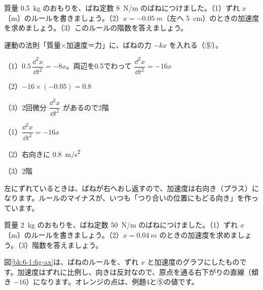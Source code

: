 \begin{reidai}[ばねのルール]
質量 \qty{0.5}{kg} のおもりを、ばね定数 \qty{8}{N/m} のばねにつけました。（1）ずれ $x$〔m〕のルールを書きましょう。（2）$x=\qty{-0.05}{m}$（左へ \qty{5}{cm}）のときの加速度を求めましょう。（3）このルールの階数を答えましょう。\par
\kangaekata 運動の法則「質量×加速度＝力」に、ばねの力 $-kx$ を入れる（⑤）。\par
\shiki （1）$0.5\,\dfrac{\dd^2x}{\dd t^2}=-8x$。両辺を0.5でわって $\dfrac{\dd^2x}{\dd t^2}=-16x$\par
\hspace*{2.6\zw}（2）$-16\times(-0.05)=0.8$\par
\hspace*{2.6\zw}（3）2回微分 $\dfrac{\dd^2x}{\dd t^2}$ があるので2階\par
\kotae （1）$\dfrac{\dd^2x}{\dd t^2}=-16x$\par
\hspace*{3.2\zw}（2）右向きに \qty{0.8}{m/s^2}\par
\hspace*{3.2\zw}（3）2階
\end{reidai}
左にずれているときは、ばねが右へおし返すので、加速度は右向き（プラス）になります。ルールのマイナスが、いつも「つり合いの位置にもどる向き」を作っています。

\noindent\begin{minipage}[c]{0.56\linewidth}
\begin{jibun}
質量 \qty{2}{kg} のおもりを、ばね定数 \qty{50}{N/m} のばねにつけました。（1）ずれ $x$〔m〕のルールを書きましょう。（2）$x=\qty{0.04}{m}$ のときの加速度を求めましょう。（3）階数を答えましょう。
\end{jibun}
\end{minipage}\hfill
\begin{minipage}[c]{0.42\linewidth}\centering
{}
\label{bk:6-1:fig-ax}
\end{minipage}
\par\vspace{3pt}
図\ref{bk:6-1:fig-ax}は、ばねのルールを、ずれ $x$ と加速度のグラフにしたものです。加速度はずれに比例し、向きは反対なので、原点を通る右下がりの直線（傾き $-16$）になります。オレンジの点は、例題4と⑤の値です。


